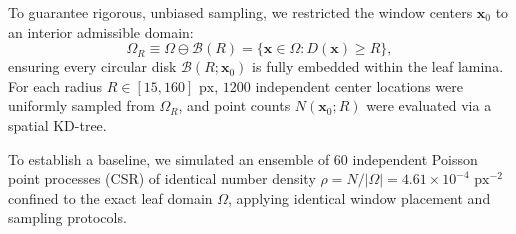 \documentclass[10pt,twocolumn]{article}
\begin{document}
To guarantee rigorous, unbiased sampling, we restricted the window centers $\mathbf{x}_0$ to an interior admissible domain:
\begin{equation}
    \Omega_R \equiv \Omega \ominus \mathcal{B}(R) = \{\mathbf{x} \in \Omega : D(\mathbf{x}) \ge R\},
\end{equation}
ensuring every circular disk $\mathcal{B}(R; \mathbf{x}_0)$ is fully embedded within the leaf lamina. For each radius $R \in [15, 160]\text{ px}$, $1200$ independent center locations were uniformly sampled from $\Omega_R$, and point counts $N(\mathbf{x}_0; R)$ were evaluated via a spatial KD-tree.

To establish a baseline, we simulated an ensemble of $60$ independent Poisson point processes (CSR) of identical number density $\rho = N / |\Omega| = 4.61 \times 10^{-4}\text{ px}^{-2}$ confined to the exact leaf domain $\Omega$, applying identical window placement and sampling protocols.

\begin{table}[t!]
\centering
\small
{}
\caption{\textbf{Local number variance $\sigma_N^2(R)$ and Fano factor $F(R)$ comparison across observation radii.}}
\label{tab:variance}
\end{table}
\end{document}
